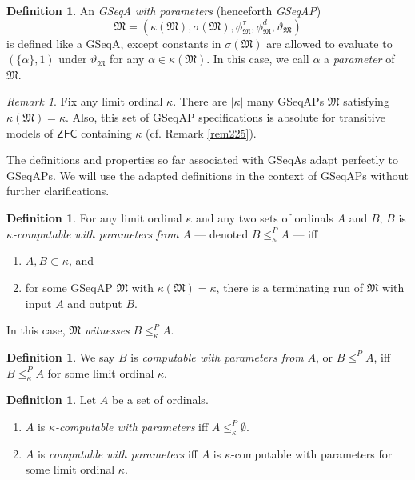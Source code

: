 \documentclass[12pt, twoside]{memoir}
\numberwithin{equation}{section}
\theoremstyle{definition}
\newtheorem{defi}[thm]{Definition}
\theoremstyle{remark}
\newtheorem{rem}[thm]{Remark}
\theoremstyle{definition}
\theoremstyle{definition}
\theoremstyle{definition}
\theoremstyle{remark}
\begin{document}
\begin{defi}\label{def836}
An \emph{GSeqA with parameters} (henceforth \emph{GSeqAP}) 
\begin{equation*}
    \mathfrak{M} = (\kappa(\mathfrak{M}), \sigma(\mathfrak{M}), \phi^{\tau}_{\mathfrak{M}}, \phi^d_{\mathfrak{M}}, \vartheta_{\mathfrak{M}})
\end{equation*} 
is defined like a GSeqA, except constants in $\sigma(\mathfrak{M})$ are allowed to evaluate to $(\{\alpha\}, 1)$ under $\vartheta_{\mathfrak{M}}$ for any $\alpha \in \kappa(\mathfrak{M})$. In this case, we call $\alpha$ a \emph{parameter} of $\mathfrak{M}$.
\end{defi}

\begin{rem}\label{rem248}
Fix any limit ordinal $\kappa$. There are $|\kappa|$ many GSeqAPs $\mathfrak{M}$ satisfying $\kappa(\mathfrak{M}) = \kappa$. Also, this set of GSeqAP specifications is absolute for transitive models of $\mathsf{ZFC}$ containing $\kappa$ (cf. Remark \ref{rem225}).
\end{rem}

The definitions and properties so far associated with GSeqAs adapt perfectly to GSeqAPs. We will use the adapted definitions in the context of GSeqAPs without further clarifications.

\begin{defi}\label{def38}
For any limit ordinal $\kappa$ and any two sets of ordinals $A$ and $B$, $B$ is $\kappa$\emph{-computable with parameters from} $A$ --- denoted $B \leq^P_{\kappa} A$ --- iff 
\begin{enumerate}[label=(\alph*)]
    \item $A, B \subset \kappa$, and
    \item for some GSeqAP $\mathfrak{M}$ with $\kappa(\mathfrak{M}) = \kappa$, there is a terminating run of $\mathfrak{M}$ with input $A$ and output $B$. 
\end{enumerate}
In this case, $\mathfrak{M}$ \emph{witnesses} $B \leq^P_{\kappa} A$.
\end{defi}

\begin{defi}\label{def839}
We say $B$ is \emph{computable with parameters from} $A$, or $B \leq^P A$, iff $B \leq^P_{\kappa} A$ for some limit ordinal $\kappa$.
\end{defi}

\begin{defi}
Let $A$ be a set of ordinals.
\begin{enumerate}[label=(\arabic*)]
    \item $A$ is $\kappa$\emph{-computable with parameters} iff $A \leq^P_{\kappa} \emptyset$.
    \item $A$ is \emph{computable with parameters} iff $A$ is $\kappa$-computable with parameters for some limit ordinal $\kappa$.
\end{enumerate}
\end{defi}
\end{document}
